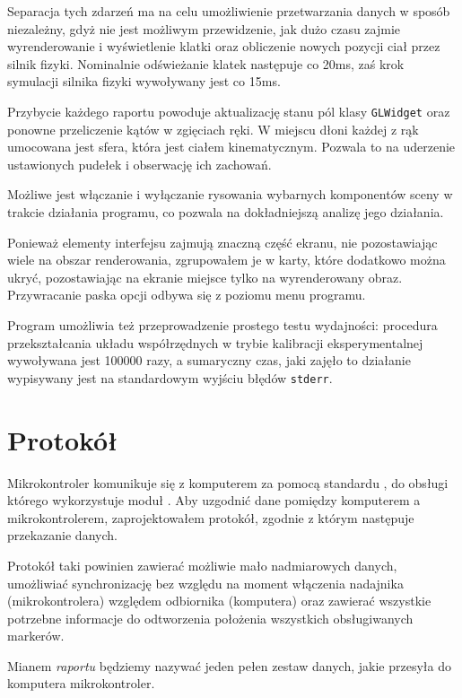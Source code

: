 Separacja tych zdarzeń ma na celu umożliwienie przetwarzania danych w sposób niezależny, gdyż nie jest możliwym przewidzenie, jak dużo czasu zajmie wyrenderowanie i wyświetlenie klatki oraz obliczenie nowych pozycji ciał przez silnik fizyki. Nominalnie odświeżanie klatek następuje co 20ms, zaś krok symulacji silnika fizyki wywoływany jest co 15ms.

Przybycie każdego raportu powoduje aktualizację stanu pól klasy \verb|GLWidget| oraz ponowne przeliczenie kątów w zgięciach ręki. W miejscu dłoni każdej z rąk umocowana jest sfera, która jest ciałem kinematycznym. Pozwala to na uderzenie ustawionych pudełek i obserwację ich zachowań.

Możliwe jest włączanie i wyłączanie rysowania wybarnych komponentów sceny w trakcie działania programu, co pozwala na dokładniejszą analizę jego działania.

Ponieważ elementy interfejsu zajmują znaczną część ekranu, nie pozostawiając wiele na obszar renderowania, zgrupowałem je w karty, które dodatkowo można ukryć, pozostawiając na ekranie miejsce tylko na wyrenderowany obraz. Przywracanie paska opcji odbywa się z poziomu menu programu.

Program umożliwia też przeprowadzenie prostego testu wydajności: procedura przekształcania układu współrzędnych w trybie kalibracji eksperymentalnej wywoływana jest 100000 razy, a sumaryczny czas, jaki zajęło to działanie wypisywany jest na standardowym wyjściu błędów \verb|stderr|.

\section{Protokół}
\label{sec:protocol}
Mikrokontroler komunikuje się z komputerem za pomocą standardu , do obsługi którego wykorzystuje moduł . Aby uzgodnić dane pomiędzy komputerem a mikrokontrolerem, zaprojektowałem protokół, zgodnie z którym następuje przekazanie danych.

Protokół taki powinien zawierać możliwie mało nadmiarowych danych, umożliwiać synchronizację bez względu na moment włączenia nadajnika (mikrokontrolera) względem odbiornika (komputera) oraz zawierać wszystkie potrzebne informacje do odtworzenia położenia wszystkich obsługiwanych markerów.

Mianem \emph{raportu} będziemy nazywać jeden pełen zestaw danych, jakie przesyła do komputera mikrokontroler.

